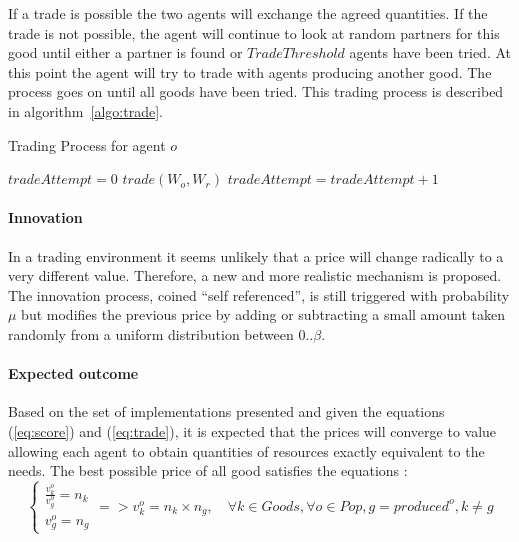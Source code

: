 \documentclass{wscpaperproc}
\begin{document}
If a trade is possible the two agents will exchange the agreed quantities. If the trade is not possible, the agent will continue to look at random partners for this good until either a partner is found or $TradeThreshold$ agents have been tried. At this point the agent will try to trade with agents producing another good. The process goes on until all goods have been tried. This trading process is described in algorithm~\ref{algo:trade}.

\begin{algorithm}
\caption{Trading Process for agent $o$}
\label{algo:trade}
	\begin{algorithmic}[1]
	\scriptsize
			\State $tradeAttempt = 0$
					\State $trade(W_o,W_r)$
				\Else
					\State $tradeAttempt = tradeAttempt + 1$					
				\EndIf
			\EndFor
		\EndFor
\end{algorithmic}
\end{algorithm}


\paragraph{Innovation} In a trading environment it seems unlikely that a price will change radically to a very different value. Therefore, a new and more realistic mechanism is proposed. The innovation process, coined ``self referenced'', is still triggered with probability $\mu$ 
but modifies the previous price by adding or subtracting a small amount taken randomly from a uniform  distribution between $0 .. \beta$.


\paragraph{Expected outcome} 

Based on the set of implementations presented and given the equations (\ref{eq:score}) and (\ref{eq:trade}), it is expected that the prices will converge to value allowing each agent to obtain quantities of resources exactly equivalent to the needs. The best possible price of all good satisfies the equations :
\begin{equation}
	\begin{cases}
		\frac{v^o_k}{v^o_g} = n_k \\
		v^o_g = n_g 
	\end{cases} =>v^o_k = n_k \times n_g, \quad \forall k \in Goods, \forall o \in Pop, g = produced^o, k \not= g 
\end{equation}
\end{document}
